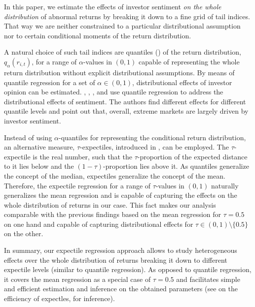 \documentclass[11pt]{article}
\begin{document}
In this paper, we estimate the effects of investor sentiment {\it{on the whole distribution} } of abnormal returns by breaking it down to a fine grid of tail indices. That way we are neither constrained to a particular distributional assumption nor to certain conditional moments of the return distribution.

A natural choice of such tail indices are quantiles (\cite{Koenker1978}) of the return distribution, $q_{\alpha}(r_{i,t})$, for a range of $\alpha$-values in $(0,1)$ capable of representing the whole return distribution without explicit distributional assumptions. By means of quantile regression for a set of $\alpha\in(0,1)$, distributional effects of investor opinion can be estimated. \cite{NI2015}, \cite{Ma2018}, \cite{ALNASSERI2021}, and \cite{HE2022} use quantile regression to address the distributional effects of sentiment. The authors find different effects for different quantile levels and point out that, overall, extreme markets are largely driven by investor sentiment.

Instead of using $\alpha$-quantiles for representing the conditional return distribution, an alternative measure, $\tau$-expectiles, introduced in \cite{Newey1987}, can be employed. The $\tau$-expectile is the real number, such that the $\tau$-proportion of the expected distance to it lies below and the $(1-\tau)$-proportion lies above it. As quantiles generalize the concept of the median, expectiles generalize the concept of the mean. Therefore, the expectile regression for a range of $\tau$-values in $(0,1)$ naturally generalizes the mean regression and is capable of capturing the effects on the whole distribution of returns in our case. This fact makes our analysis comparable with the previous findings based on the mean regression for $\tau=0.5$ on one hand and capable of capturing distributional effects for $\tau\in (0,1)\setminus\{0.5\}$ on the other.

In summary, our expectile regression approach allows to study heterogeneous effects over the whole distribution of returns breaking it down to different expectile levels (similar to quantile regression). As opposed to quantile regression, it covers the mean regression as a special case of $\tau=0.5$ and facilitates simple and efficient estimation and inference on the obtained parameters (see \cite{waltrup2015} on the efficiency of expectles, \cite{Barry2018} for inference).

\end{document}
